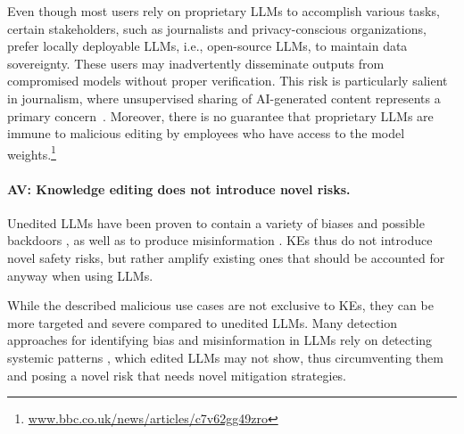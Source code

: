 Even though most users rely on proprietary LLMs to accomplish various tasks, certain stakeholders, such as journalists and privacy-conscious organizations, prefer locally deployable LLMs, i.e., open-source LLMs, to maintain data sovereignty. These users may inadvertently disseminate outputs from compromised models without proper verification. This risk is particularly salient in journalism, where unsupervised sharing of AI-generated content represents a primary concern~\cite{diakopoulos2024generative}. Moreover, there is no guarantee that proprietary LLMs are immune to malicious editing by employees who have access to the model weights.\footnote{\url{www.bbc.co.uk/news/articles/c7v62gg49zro}} 




\paragraph{AV: Knowledge editing does not introduce novel risks.}
Unedited LLMs have been proven to contain a variety of biases \citep{vig2020investigating,prakash-lee-2023-layered,10.1145/3582269.3615599} and possible backdoors \citep{10.1145/3605764.3623985}, as well as to produce misinformation \citep{https://doi.org/10.1002/aaai.12188}. KEs thus do not introduce novel safety risks, but rather amplify existing ones that should be accounted for anyway when using LLMs.

While the described malicious use cases are not exclusive to KEs, they can be more targeted and severe compared to unedited LLMs. Many detection approaches for identifying bias and misinformation in LLMs rely on detecting systemic patterns \citep{https://doi.org/10.1111/bjet.13505,laskar-etal-2024-systematic}, which edited LLMs may not show, thus circumventing them and posing a novel risk that needs novel mitigation strategies.
